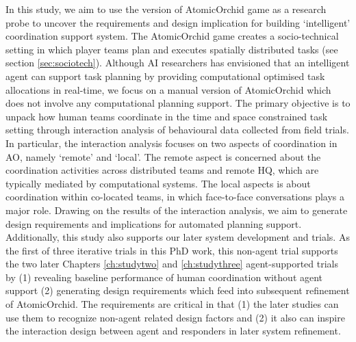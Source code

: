 In this study, we aim to use the version of AtomicOrchid game as a research probe to uncover the requirements and design implication for building `intelligent' coordination support system. The AtomicOrchid game creates a socio-technical setting in which player teams plan and executes spatially distributed tasks (see section \ref{sec:sociotech}). Although \ac{AI} researchers has envisioned that an intelligent agent can support task planning by providing computational optimised task allocations in real-time, we focus on a manual version of AtomicOrchid which does not involve any computational planning support. The primary objective is to unpack how human teams coordinate in the time and space constrained task setting through interaction analysis of behavioural data collected from field trials. In particular, the interaction analysis focuses on two aspects of coordination in \ac{AO}, namely `remote' and `local'. The remote aspect is concerned about the coordination activities across distributed teams and remote HQ, which are typically mediated by computational systems. The local aspects is about coordination within co-located teams, in which face-to-face conversations plays a major role. Drawing on the results of the interaction analysis, we aim to generate design requirements and implications for automated planning support. \\

Additionally, this study also supports our later system development and trials. As the first of three iterative trials in this PhD work, this non-agent trial supports the two later Chapters \ref{ch:studytwo} and \ref{ch:studythree} agent-supported trials by (1) revealing baseline performance of human coordination without agent support (2) generating design requirements which feed into subsequent refinement of AtomicOrchid. The requirements are critical in that (1) the later studies can use them to recognize non-agent related design factors and (2) it also can inspire the interaction design between agent and responders in later system refinement.  \\


